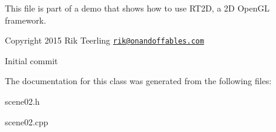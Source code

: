 This file is part of a demo that shows how to use R\+T2D, a 2D Open\+GL framework.


\begin{DoxyItemize}
\item Copyright 2015 Rik Teerling \href{mailto:rik@onandoffables.com}{\tt rik@onandoffables.\+com}
\begin{DoxyItemize}
\item Initial commit 
\end{DoxyItemize}
\end{DoxyItemize}

The documentation for this class was generated from the following files\+:\begin{DoxyCompactItemize}
\item 
scene02.\+h\item 
scene02.\+cpp\end{DoxyCompactItemize}
